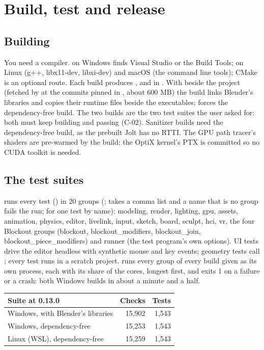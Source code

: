 \chapter{Build, test and release}
\label{ch:build}

\section{Building}
You need a compiler.  on Windows finds Visual Studio or the Build Tools;  on Linux (g++, libx11-dev, libxi-dev) and macOS (the command line tools); CMake is an optional route.
Each build produces ,  and  in . With
 beside the project (fetched by  at the commits
pinned in , about 600 MB) the build links Blender's libraries and copies their
runtime files beside the executables;  forces the dependency-free build. The two builds are
the two test suites the user asked for: both must keep building and passing (C-02). Sanitizer builds need the
dependency-free build, as the prebuilt Jolt has no RTTI. The GPU path tracer's shaders are pre-warmed by the build;
the OptiX kernel's PTX is committed so no CUDA toolkit is needed.

\section{The test suites}
 runs every test () in 20 groups
(;  takes a comma list and a name that is no group fails the run;
 for one test by name): modeling, render, lighting, gpu, assets, animation, physics, editor,
livelink, input, sketch, board, sculpt, hci, vr, the four Blockout groups (blockout, blockout\_modifiers,
blockout\_join, blockout\_piece\_modifiers) and runner (the test program's own options). UI tests
drive the editor headless with synthetic mouse and key events; geometry tests call ; every test runs in
a scratch project.  runs every group of every build given as its own process, each with its
share of the cores, longest first, and exits 1 on a failure or a crash: both Windows builds in about a minute and a
half.

\begin{center}
\begin{tabular}{lrr}
\toprule
Suite at 0.13.0 & Checks & Tests \\
\midrule
Windows, with Blender's libraries & 15,902 & 1,543 \\
Windows, dependency-free & 15,253 & 1,543 \\
Linux (WSL), dependency-free & 15,259 & 1,543 \\
\bottomrule
\end{tabular}
\end{center}

